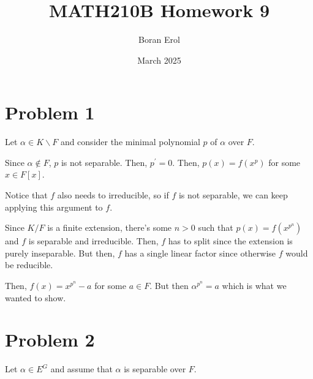 \documentclass{article}
\title{MATH210B Homework 9}
\date{March 2025}
\author{Boran Erol}
\theoremstyle{definition}
\newtheorem{lemma}[theorem]{Lemma}
\begin{document}
\maketitle

\section{Problem 1}




Let $ \alpha \in K \backslash F $ and consider the minimal polynomial $ p $ of $ \alpha $ over $ F $.

Since $ \alpha \notin F $, $ p $ is not separable. Then, $ p^{\prime} = 0 $.
Then, $ p(x) = f(x^{p}) $ for some $ x \in F[x] $.

Notice that $ f $ also needs to irreducible, so if $ f $ is not separable, we can keep applying this argument to $ f $.

Since $ K/F $ is a finite extension, there's some $ n > 0 $ such that $ p(x) = f(x^{p^{n}}) $ and $ f $ is separable
and irreducible. Then, $ f $ has to split since the extension is purely inseparable. But then, $ f $ has a single linear factor
since otherwise $ f $ would be reducible.

Then, $ f(x) = x^{p^{n}} - a $ for some $ a \in F $. But then $ \alpha^{p^{n}} = a $ which is what we wanted to show.

\section{Problem 2}

Let $ \alpha \in E^{G} $ and assume that $ \alpha $ is separable over $ F $.
\end{document}
